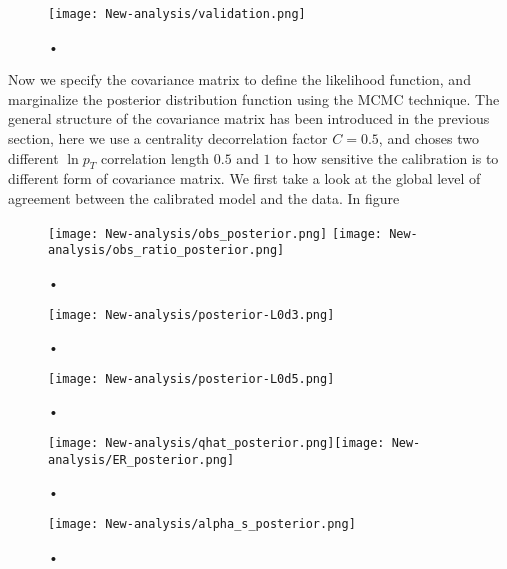\begin{figure}
\centering
\texttt{[image: New-analysis/validation.png]}
\caption{•}
\label{fig:new:validation}
\end{figure}

Now we specify the covariance matrix to define the likelihood function, and marginalize the posterior distribution function using the MCMC technique.
The general structure of the covariance matrix has been introduced in the previous section, here we use a centrality decorrelation factor $C=0.5$, and choses two different $\ln p_T$ correlation length $0.5$ and $1$ to how sensitive the calibration is to different form of covariance matrix.
We first take a look at the global level of agreement between the calibrated model and the data.
In figure 

\begin{figure}
\centering
\texttt{[image: New-analysis/obs\_posterior.png]}
\texttt{[image: New-analysis/obs\_ratio\_posterior.png]}
\caption{•}
\label{fig:new:obs_posterior}
\end{figure}

\begin{figure}
\centering
\texttt{[image: New-analysis/posterior-L0d3.png]}
\caption{•}
\label{fig:new:posterior-l0d3}
\end{figure}

\begin{figure}
\centering
\texttt{[image: New-analysis/posterior-L0d5.png]}
\caption{•}
\label{fig:new:posterior-l0d5}
\end{figure}

\begin{figure}
\centering
\texttt{[image: New-analysis/qhat\_posterior.png]}\texttt{[image: New-analysis/ER\_posterior.png]}
\caption{•}
\label{fig:new:posterior-qhat}
\end{figure}

\begin{figure}
\centering
\texttt{[image: New-analysis/alpha\_s\_posterior.png]}
\caption{•}
\label{fig:new:posterior-alphas}
\end{figure}
